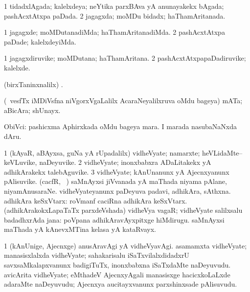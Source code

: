 \bentry
{}
\gl{\gu}
\bmng
\bnum
\num{1} tidadxlAgada; kalelxdeya; neYtika parxBAva yA anunayakekx bAgada; pashAcxtAtxpa paDada. 
\num{2} jagagxda; moMDu bidadx; haThamAritanada. 
\enum
\emng
\eentry

\bentry
{}
\gl{\kirxvi}
\bmng
\bnum
\num{1} jagagxde; moMDutanadiMda; haThamAritanadiMda. 
\num{2} pashAcxtAtxpa paDade; kalelxdeyiMda. 
\enum
\emng
\eentry

\bentry
{}
\gl{\nA}
\bmng
\bnum
\num{1} jagagxdiruvike; moMDutana; haThamAritana. 
\num{2} pashAcxtAtxpapaDadiruvike; kalelxde. 
\enum
\emng
\eentry

\bentry
{}
\gl{\saMkiSx}
\bmng
(birxTaninxnalilx) . 
\emng
\eentry

\bentry
{}
\gl{\nA}
\bmng
(\kanmu\ vesfTx iMDiVsfna niVgorxVgaLalilx AcaraNeyalilxruva oMdu bageya) mATa; aBicAra; shUnayx. 
\emng
\eentry

\bentry
{}
\gl{\nA}
\bmng
ObiVci: 
\banum
{} pashicxma Aphirxkada oMdu bageya mara. 
 I marada nasubaNaNxda dAru. 
\eanum
\emng
\eentry

\bentry
{}
\gl{\nA}
\bmng
\bnum
\num{1} (kAyaR, aBAyxsa, guNa yA rUpadalilx) vidheVyate; namarxte; heVLidaMte--keVLuvike, naDeyuvike. 
\num{2} vidheVyate; inonxbabxra ADaLitakekx yA adhikArakekx talebAguvike. 
\num{3} vidheVyate; kAnUnanunx yA Ajecnxyanunx pAlisuvike. 
 (cacfR, \kanmu\ \roVkAyx) 
\banum
{} saMnAyxsi jiVvanada yA maThada niyama pAlane, niyamAnusaraNe. 
 vidheVyateyanunx paDeyuva padavi, adhikAra, sAthxna. 
 adhikAra keSxVtarx:  roVmanf caciRna adhikAra keSxVtarx. 
 (adhikArakokxLapaTaTx parxdeVshada) vidheVya vagaR; vidheVyate salilxsalu badadhxrAda jana:  poVpana adhikAravAyxpitxge hiMdirugu. 
 saMnAyxsi maThada yA kAnevxMTina kelasa yA kataRvayx. 
\eanum
\numie
\enum
\emng

\noindent
\gl{\pagu}
\bmng
\bnum
\num{1}  (kAnUnige, Ajecnxge) anusAravAgi yA vidheVyavAgi. 
  
\banum
{} asamamxta vidheVyate; manasisxlalxda vidheVyate; sahakarisalu iSaTxvilalxdidadxrU savxsaMkalapxvanunx badigiTuTx, inonxbabxna iSaTxdaMte naDeyuvudu. 
 avicArita vidheVyate; eMthadeV AjecnxyAgali manasisxge hacicxkoLaLxde adaraMte naDeyuvudu; Ajecnxya aucitayxvanunx parxshinxsade pAlisuvudu. 
\eanum
\numie
\enum
\emng
\eentry

